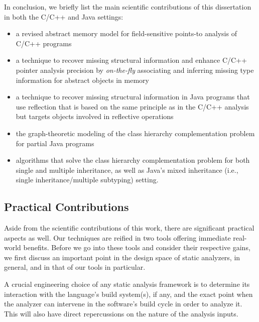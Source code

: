 In conclusion, we briefly list the main scientific contributions of
this dissertation in both the C/C++ and Java settings:
\begin{itemize}[--]
\item a revised abstract memory model for field-sensitive points-to
  analysis of C/C++ programs
\item a technique to recover missing structural information and
  enhance C/C++ pointer analysis precision by \emph{on-the-fly}
  associating and inferring missing type information for abstract
  objects in memory
\item a technique to recover missing structural information in Java
  programs that use reflection that is based on the same principle as
  in the C/C++ analysis but targets objects involved in reflective
  operations
\item the graph-theoretic modeling of the class hierarchy
  complementation problem for partial Java programs
\item algorithms that solve the class hierarchy complementation
  problem for both single and multiple inheritance, as well as Java's
  mixed inheritance (i.e., single inheritance/multiple subtyping)
  setting.
\end{itemize}


\subsection{Practical Contributions}

Aside from the scientific contributions of this work, there are
significant practical aspects as well. Our techniques are reified in
two tools offering immediate real-world benefits. Before we go into
these tools and consider their respective gains, we first discuss an
important point in the design space of static analyzers, in general,
and in that of our tools in particular.

A crucial engineering choice of any static analysis framework is to
determine its interaction with the language's build system(s), if any,
and the exact point when the analyzer can intervene in the software's
build cycle in order to analyze it. This will also have direct
repercussions on the nature of the analysis inputs.

